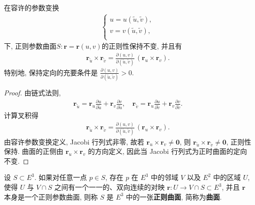 \documentclass[../../main.tex]{subfiles}%
\begin{document}
\begin{theorem}
在容许的参数变换
\begin{align*}
\begin{cases}
u=u(\tilde{u},\tilde{v}),\\
v=v(\tilde{u},\tilde{v}),\\
\end{cases}
\end{align*}
下, 正则参数曲面\( S : \bm{r} = \bm{r}(u, v) \)的正则性保持不变, 并且有
\begin{align*}
\bm{r}_{\tilde{u}} \times \bm{r}_{\tilde{v}} = \frac{\partial(u, v)}{\partial(\tilde{u}, \tilde{v})}\, (\bm{r}_u \times \bm{r}_v).
\end{align*}
特别地, 保持定向的充要条件是 \( \frac{\partial(u, v)}{\partial(\tilde{u}, \tilde{v})} > 0 \).
\end{theorem}
\begin{proof}

由链式法则,
\begin{align*}
\bm{r}_{\tilde{u}} = \bm{r}_u \frac{\partial u}{\partial \tilde{u}} + \bm{r}_v \frac{\partial v}{\partial \tilde{u}},\quad
\bm{r}_{\tilde{v}} = \bm{r}_u \frac{\partial u}{\partial \tilde{v}} + \bm{r}_v \frac{\partial v}{\partial \tilde{v}}.
\end{align*}
计算叉积得
\begin{align*}
\bm{r}_{\tilde{u}} \times \bm{r}_{\tilde{v}} = \frac{\partial(u, v)}{\partial(\tilde{u}, \tilde{v})}\, (\bm{r}_u \times \bm{r}_v).
\end{align*}
由容许参数变换定义, Jacobi 行列式非零, 故若 \( \bm{r}_u \times \bm{r}_v \neq \bm{0} \), 则 \( \bm{r}_{\tilde{u}} \times \bm{r}_{\tilde{v}} \neq \bm{0} \), 正则性保持. 曲面的正侧由 \( \bm{r}_u \times \bm{r}_v \) 的方向定义, 因此当 Jacobi 行列式为正时曲面的定向不变.

\end{proof}

\begin{definition}
设 \( S \subset E^3 \). 如果对任意一点 \( p \in S \), 存在 \( p \) 在 \( E^3 \) 中的邻域 \( V \) 以及 \( E^2 \) 中的区域 \( U \), 使得 \( U \) 与 \( V \cap S \) 之间有一个一一的、双向连续的对映 \( \bm{r} : U \to V \cap S\subset E^3 \), 并且 \( \bm{r} \) 本身是一个正则参数曲面, 则称 \( S \) 是 \( E^3 \) 中的一张\textbf{正则曲面}, 简称为\textbf{曲面}.
\end{definition}
\end{document}
